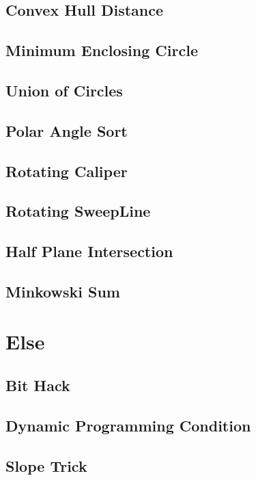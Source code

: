\subsection{Convex Hull Distance}

\subsection{Minimum Enclosing Circle}

\subsection{Union of Circles}

\subsection{Polar Angle Sort}

\subsection{Rotating Caliper}

\subsection{Rotating SweepLine}

\subsection{Half Plane Intersection}

\subsection{Minkowski Sum}


\section{Else}
\subsection{Bit Hack}

\subsection{Dynamic Programming Condition}

\subsection{Slope Trick}

